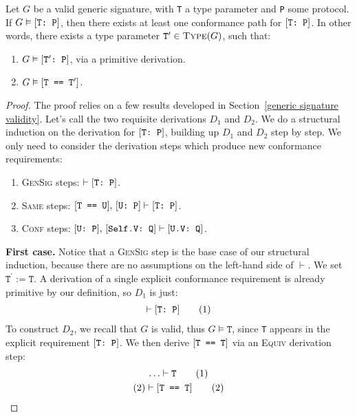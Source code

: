\documentclass[../generics]{subfiles}
\begin{document}
\begin{theorem}\label{conformance paths theorem} Let $G$ be a valid generic signature, with \texttt{T} a type parameter and \texttt{P} some protocol. If $G\vDash[\texttt{T:~P}]$, then there exists at least one conformance path for $[\texttt{T:~P}]$. In other words, there exists a type parameter $\texttt{T}^\prime\in\textsc{Type}({G})$, such that:
\begin{enumerate}
\item $G\vDash[\texttt{$\texttt{T}^\prime$:~P}]$, via a primitive derivation.
\item $G\vDash[\texttt{T == $\texttt{T}^\prime$}]$.
\end{enumerate}
\end{theorem}
\begin{proof}
The proof relies on a few results developed in Section~\ref{generic signature validity}. Let's call the two requisite derivations $D_1$ and $D_2$. We do a structural induction on the derivation for $[\texttt{T:~P}]$, building up $D_1$ and $D_2$ step by step. We only need to consider the derivation steps which produce new conformance requirements:
\begin{enumerate}
\item {}\textsc{GenSig} steps: $\vdash[\texttt{T:~P}]$.
\item {}\textsc{Same} steps: $[\texttt{T == U}],\,[\texttt{U:~P}]\vdash[\texttt{T:~P}]$.
\item {}\textsc{Conf} steps: $[\texttt{U:~P}],\,[\texttt{Self.V:~Q}]\vdash[\texttt{U.V:~Q}]$.
\end{enumerate}

\noindent \textbf{First case.} Notice that a \textsc{GenSig} step is the base case of our structural induction, because there are no assumptions on the left-hand side of $\vdash$. We set $\texttt{T}^\prime := \texttt{T}$. A derivation of a single explicit conformance requirement is already primitive by our definition, so $D_1$ is just:
\begin{gather*}
\vdash[\texttt{T:~P}]\tag{1}
\end{gather*}
To construct $D_2$, we recall that $G$ is valid, thus $G\vDash\texttt{T}$, since \texttt{T} appears in the explicit requirement $[\texttt{T:~P}]$. We then derive $[\texttt{T == T}]$ via an \textsc{Equiv} derivation step:
\begin{gather*}
\ldots\vdash\texttt{T}\tag{1}\\
(2)\vdash[\texttt{T == T}]\tag{2}
\end{gather*}


\end{proof}
\end{document}
